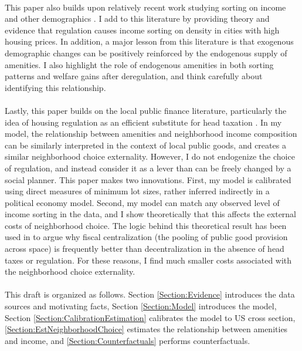 \documentclass[11pt]{article}
\begin{document}
	\paragraph*{}
	This paper also builds upon relatively recent work studying sorting on income and other demographics \citep{diamond2016, bshartley2020, couturehandbury, Coutureetal, superstarcities, su2021, citysizewagegap, Gentrificationcycles, FogliGuerrieri, ccpoortransport, parispoor}. I add to this literature by providing theory and evidence that regulation causes income sorting on density in cities with high housing prices. In addition, a major lesson from this literature is that exogenous demographic changes can be positively reinforced by the endogenous supply of amenities. I also highlight the role of endogenous amenities in both sorting patterns and welfare gains after deregulation, and think carefully about identifying this relationship.
	
	\paragraph*{}
	Lastly, this paper builds on the local public finance literature, particularly the idea of housing regulation as an efficient substitute for head taxation \citep{hamilton1976, calabresetal, keepingpeopleout, eppleplatt, ineffTiebout, barcoate}. In my model, the relationship between amenities and neighborhood income composition can be similarly interpreted in the context of local public goods, and creates a similar neighborhood choice externality. However, I do not endogenize the choice of regulation, and instead consider it as a lever than can be freely changed by a social planner. This paper makes two innovations. First, my model is calibrated using direct measures of minimum lot sizes, rather inferred indirectly in a political economy model. Second, my model can match any observed level of income sorting in the data, and I show theoretically that this affects the external costs of neighborhood choice. The logic behind this theoretical result has been used in \cite{ineffTiebout} to argue why fiscal centralization (the pooling of public good provision across space) is frequently better than decentralization in the absence of head taxes or regulation. For these reasons, I find much smaller costs associated with the neighborhood choice externality.
	
	\paragraph*{}
	This draft is organized as follows. Section \ref{Section:Evidence} introduces the data sources and motivating facts, Section \ref{Section:Model} introduces the model, Section \ref{Section:CalibrationEstimation} calibrates the model to US cross section, \ref{Section:EstNeighborhoodChoice} estimates the relationship between amenities and income, and \ref{Section:Counterfactuals} performs counterfactuals. 
\end{document}
